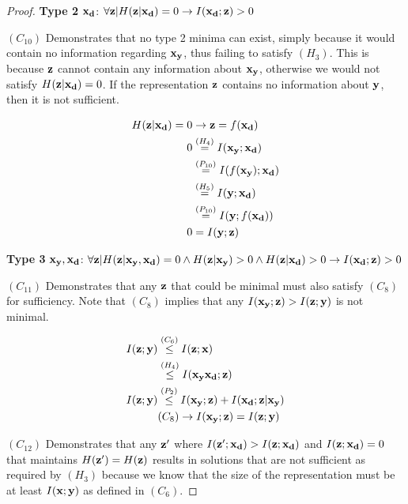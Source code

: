 \begin{theorem}
\begin{proof}
\textbf{Type 2} ${\mathbf{x}}_{\mathbf{d}}$: $\forall {\mathbf{z}}|H({\mathbf{z}}| {\mathbf{x}}_{\mathbf{d}})=0 \rightarrow I({\mathbf{x}}_{\mathbf{d}}; {\mathbf{z}}) > 0$

$(C_{10})$ Demonstrates that no type 2 minima can exist, simply because it would contain no information regarding ${\mathbf{x}}_{\mathbf{y}}$, thus failing to satisfy $(H_3)$. This is because ${\mathbf{z}}$ cannot contain any information about ${\mathbf{x}}_{\mathbf{y}}$, otherwise we would not satisfy $H({\mathbf{z}}|{\mathbf{x}}_{\mathbf{d}})=0$. If the representation ${\mathbf{z}}$ contains no information about ${\mathbf{y}}$, then it is not sufficient.

$$
\begin{aligned}
    H({\mathbf{z}}| {\mathbf{x}}_{\mathbf{d}}) = 0 & \rightarrow {\mathbf{z}} = f({\mathbf{x}}_{\mathbf{d}}) \\
    0 &\stackrel{\left(H_4\right)}{=} I({\mathbf{x}}_{\mathbf{y}}; {\mathbf{x}}_{\mathbf{d}})\\
    &\stackrel{\left(P_{10}\right)}{=} I(f({\mathbf{x}}_{\mathbf{y}});{\mathbf{x}}_{\mathbf{d}})\\
    &\stackrel{\left(H_5\right)}{=} I({\mathbf{y}}; {\mathbf{x}}_{\mathbf{d}})\\
    &\stackrel{\left(P_{10}\right)}{=} I({\mathbf{y}};f({\mathbf{x}}_{\mathbf{d}}))\\
    0&=I({\mathbf{y}};{\mathbf{z}})
\end{aligned}
$$

\textbf{Type 3} ${\mathbf{x}}_{\mathbf{y}}, {\mathbf{x}}_{\mathbf{d}}$: $\forall {\mathbf{z}}|H({\mathbf{z}}| {\mathbf{x}}_{\mathbf{y}} , {\mathbf{x}}_{\mathbf{d}})=0 \land H({\mathbf{z}}|{\mathbf{x}}_{\mathbf{y}})>0 \land H({\mathbf{z}}| {\mathbf{x}}_{\mathbf{d}})>0 \rightarrow I({\mathbf{x}}_{\mathbf{d}}; {\mathbf{z}}) > 0$

$(C_{11})$ Demonstrates that any ${\mathbf{z}}$ that could be minimal must also satisfy $(C_8)$ for sufficiency. Note that $(C_8)$ implies that any $I({\mathbf{x}}_{\mathbf{y}}; {\mathbf{z}}) >  I({\mathbf{z}};{\mathbf{y}})$ is not minimal.

$$
\begin{aligned}
    I({\mathbf{z}}; {\mathbf{y}})&\stackrel{\left(C_6\right)}{\leq} I({\mathbf{z}}; {\mathbf{x}})  \\
    &\stackrel{\left(H_4\right)}{\leq}  I({\mathbf{x}}_{\mathbf{y}} {\mathbf{x}}_{\mathbf{d}}; {\mathbf{z}}) \\
    I({\mathbf{z}}; {\mathbf{y}}) &\stackrel{\left(P_2\right)}{\leq} I({\mathbf{x}}_{\mathbf{y}}; {\mathbf{z}}) + I({\mathbf{x}}_{\mathbf{d}}; {\mathbf{z}}| {\mathbf{x}}_{\mathbf{y}}) \\
    & (C_8) \rightarrow I({\mathbf{x}}_{\mathbf{y}}; {\mathbf{z}}) =  I({\mathbf{z}}; {\mathbf{y}}) \\
\end{aligned}
$$

$(C_{12})$ Demonstrates that any ${\mathbf{z}}'$ where $I({\mathbf{z}}'; {\mathbf{x}}_{\mathbf{d}})>I({\mathbf{z}}; {\mathbf{x}}_{\mathbf{d}})$ and $I({\mathbf{z}}; {\mathbf{x}}_{\mathbf{d}}) = 0$ that maintains $H({\mathbf{z}}') = H({\mathbf{z}})$ results in  solutions that are not sufficient as required by $(H_3)$ because we know that the size of the representation must be at least $I({\mathbf{x}}; {\mathbf{y}})$ as defined in $(C_6)$.


\end{proof}
\end{theorem}
